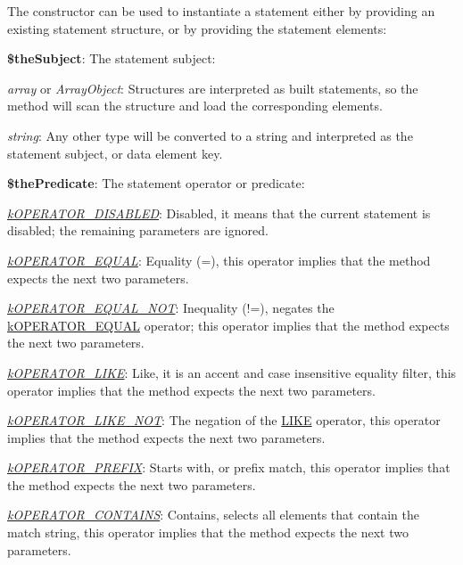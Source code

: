 The constructor can be used to instantiate a statement either by providing an existing statement structure, or by providing the statement elements\-:


\begin{DoxyItemize}
\item {\bfseries \$the\-Subject}\-: The statement subject\-: 
\begin{DoxyItemize}
\item {\itshape array} or {\itshape Array\-Object}\-: Structures are interpreted as built statements, so the method will scan the structure and load the corresponding elements. 
\item {\itshape string}\-: Any other type will be converted to a string and interpreted as the statement subject, or data element key. 
\end{DoxyItemize}
\item {\bfseries \$the\-Predicate}\-: The statement operator or predicate\-: 
\begin{DoxyItemize}
\item {\itshape \hyperlink{}{k\-O\-P\-E\-R\-A\-T\-O\-R\-\_\-\-D\-I\-S\-A\-B\-L\-E\-D}}\-: Disabled, it means that the current statement is disabled; the remaining parameters are ignored. 
\item {\itshape \hyperlink{}{k\-O\-P\-E\-R\-A\-T\-O\-R\-\_\-\-E\-Q\-U\-A\-L}}\-: Equality (=), this operator implies that the method expects the next two parameters. 
\item {\itshape \hyperlink{}{k\-O\-P\-E\-R\-A\-T\-O\-R\-\_\-\-E\-Q\-U\-A\-L\-\_\-\-N\-O\-T}}\-: Inequality (!=), negates the \hyperlink{}{k\-O\-P\-E\-R\-A\-T\-O\-R\-\_\-\-E\-Q\-U\-A\-L} operator; this operator implies that the method expects the next two parameters. 
\item {\itshape \hyperlink{}{k\-O\-P\-E\-R\-A\-T\-O\-R\-\_\-\-L\-I\-K\-E}}\-: Like, it is an accent and case insensitive equality filter, this operator implies that the method expects the next two parameters. 
\item {\itshape \hyperlink{}{k\-O\-P\-E\-R\-A\-T\-O\-R\-\_\-\-L\-I\-K\-E\-\_\-\-N\-O\-T}}\-: The negation of the \hyperlink{}{L\-I\-K\-E} operator, this operator implies that the method expects the next two parameters. 
\item {\itshape \hyperlink{}{k\-O\-P\-E\-R\-A\-T\-O\-R\-\_\-\-P\-R\-E\-F\-I\-X}}\-: Starts with, or prefix match, this operator implies that the method expects the next two parameters. 
\item {\itshape \hyperlink{}{k\-O\-P\-E\-R\-A\-T\-O\-R\-\_\-\-C\-O\-N\-T\-A\-I\-N\-S}}\-: Contains, selects all elements that contain the match string, this operator implies that the method expects the next two parameters. 

\end{DoxyItemize}
\end{DoxyItemize}
